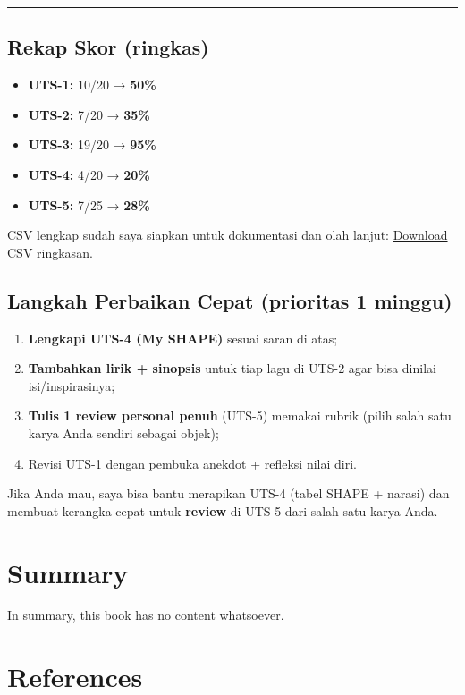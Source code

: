 \documentclass[
  letterpaper,
  DIV=11,
  numbers=noendperiod]{scrreprt}
\providecommand{\tightlist}{%
  \setlength{\itemsep}{0pt}\setlength{\parskip}{0pt}}
\begin{document}
\begin{center}\rule{0.5\linewidth}{0.5pt}\end{center}

\section{Rekap Skor (ringkas)}\label{rekap-skor-ringkas}

\begin{itemize}
\tightlist
\item
  \textbf{UTS-1:} 10/20 → \textbf{50\%}
\item
  \textbf{UTS-2:} 7/20 → \textbf{35\%}
\item
  \textbf{UTS-3:} 19/20 → \textbf{95\%}
\item
  \textbf{UTS-4:} 4/20 → \textbf{20\%}
\item
  \textbf{UTS-5:} 7/25 → \textbf{28\%}
\end{itemize}

CSV lengkap sudah saya siapkan untuk dokumentasi dan olah lanjut:
\href{sandbox:/mnt/data/UTS_self_assessment.csv}{Download CSV
ringkasan}.

\section{Langkah Perbaikan Cepat (prioritas 1
minggu)}\label{langkah-perbaikan-cepat-prioritas-1-minggu}

\begin{enumerate}
\def\labelenumi{\arabic{enumi}.}
\tightlist
\item
  \textbf{Lengkapi UTS-4 (My SHAPE)} sesuai saran di atas;
\item
  \textbf{Tambahkan lirik + sinopsis} untuk tiap lagu di UTS-2 agar bisa
  dinilai isi/inspirasinya;
\item
  \textbf{Tulis 1 review personal penuh} (UTS-5) memakai rubrik (pilih
  salah satu karya Anda sendiri sebagai objek);
\item
  Revisi UTS-1 dengan pembuka anekdot + refleksi nilai diri.
\end{enumerate}

Jika Anda mau, saya bisa bantu merapikan UTS-4 (tabel SHAPE + narasi)
dan membuat kerangka cepat untuk \textbf{review} di UTS-5 dari salah
satu karya Anda.


\chapter{Summary}\label{summary}

In summary, this book has no content whatsoever.


\chapter*{References}\label{references}


\label{refs}
\end{document}
